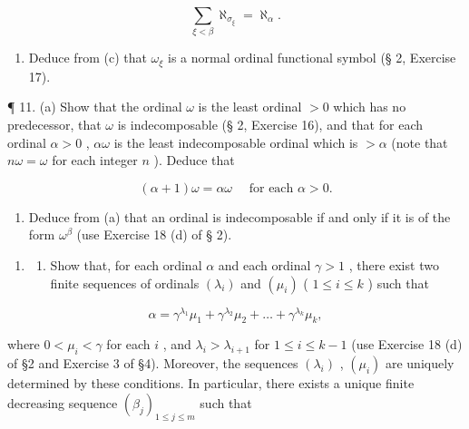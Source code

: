 \[
\sum_ {\xi <   \beta} \aleph_ {\sigma_ {\xi}} = \aleph_ {\alpha}.
\]

\begin{enumerate}
\def\labelenumi{(\alph{enumi})}
\setcounter{enumi}{3}
\tightlist
\item
  Deduce from (c) that \(\omega_{\xi}\) is a normal ordinal functional symbol (§ 2, Exercise 17).
\end{enumerate}

¶ 11. (a) Show that the ordinal \(\omega\) is the least ordinal \(>0\) which has no predecessor, that \(\omega\) is indecomposable (§ 2, Exercise 16), and that for each ordinal \(\alpha > 0\) , \(\alpha\omega\) is the least indecomposable ordinal which is \(>\alpha\) (note that \(n\omega = \omega\) for each integer \(n\) ). Deduce that

\[
(\alpha + 1) \omega = \alpha \omega \quad \text { for   each } \alpha > 0.
\]

\begin{enumerate}
\def\labelenumi{(\alph{enumi})}
\setcounter{enumi}{1}
\tightlist
\item
  Deduce from (a) that an ordinal is indecomposable if and only if it is of the form \(\omega^{\beta}\) (use Exercise 18 (d) of § 2).
\end{enumerate}

\begin{enumerate}
\def\labelenumi{\arabic{enumi}.}
\setcounter{enumi}{11}
\tightlist
\item
  \begin{enumerate}
  \def\labelenumii{(\alph{enumii})}
  \tightlist
  \item
    Show that, for each ordinal \(\alpha\) and each ordinal \(\gamma > 1\) , there exist two finite sequences of ordinals \((\lambda_i)\) and \((\mu_i)\) ( \(1 \leqslant i \leqslant k\) ) such that
  \end{enumerate}
\end{enumerate}

\[
\alpha = \gamma^ {\lambda_ {1}} \mu_ {1} + \gamma^ {\lambda_ {2}} \mu_ {2} + \dots + \gamma^ {\lambda_ {k}} \mu_ {k},
\]

where \(0 < \mu_i < \gamma\) for each \(i\) , and \(\lambda_i > \lambda_{i+1}\) for \(1 \leqslant i \leqslant k - 1\) (use Exercise 18 (d) of §2 and Exercise 3 of §4). Moreover, the sequences \((\lambda_i)\) , \((\mu_i)\) are uniquely determined by these conditions. In particular, there exists a unique finite decreasing sequence \((\beta_j)_{1 \leqslant j \leqslant m}\) such that


